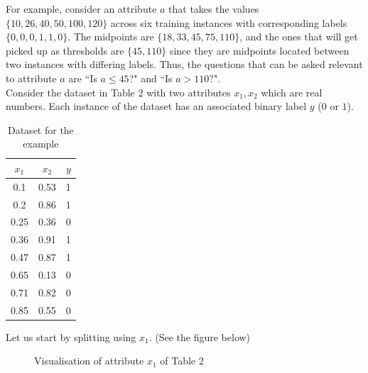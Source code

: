 For example, consider an attribute $a$ that takes the values $\{10, 26, 40, 50, 100, 120\}$ across six training instances with corresponding labels $\{0, 0, 0, 1, 1, 0\}$. The midpoints are $\{18, 33, 45, 75, 110\}$, and the ones that will get picked up as thresholds are $\{45, 110\}$ since they are midpoints located between two instances with differing labels. Thus, the questions that can be asked relevant to attribute $a$ are ``Is $a \le 45$?" and ``Is $a > 110?$". \\

 Consider the dataset in Table 2 with two attributes $x_1,x_2$ which are real numbers. Each instance of the dataset has an associated binary label $y$ ($0$ or $1$).

\begin{table}[ht]
  \centering
  \begin{tabular}{|c|c|c|}
    \hline
    $x_1$ & $x_2$ & $y$ \\
    \hline
    0.1   & 0.53  & 1   \\
    \hline
    0.2   & 0.86  & 1   \\
    \hline
    0.25  & 0.36  & 0   \\
    \hline
    0.36  & 0.91  & 1   \\
    \hline
    0.47  & 0.87  & 1   \\
    \hline
    0.65  & 0.13  & 0   \\
    \hline
    0.71  & 0.82  & 0   \\
    \hline
    0.85  & 0.55  & 0   \\
    \hline
  \end{tabular}
  \caption{Dataset for the example}
  \label{tab:my_label}
\end{table}

Let us start by splitting using $x_1$. (See the figure below)
\begin{figure}[ht]
  \centering
  \caption{Visualisation of attribute $x_1$ of Table 2}
  \label{fig:enter-label}
\end{figure}

